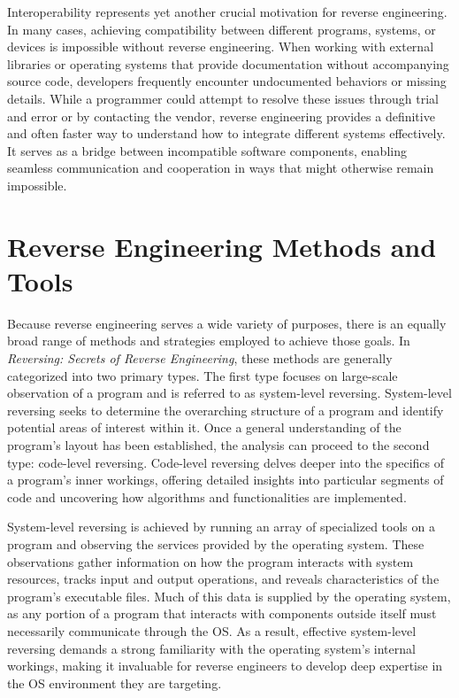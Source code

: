 Interoperability represents yet another crucial motivation for reverse engineering. In many cases, achieving compatibility between different programs, systems, or devices is impossible without reverse engineering. When working with external libraries or operating systems that provide documentation without accompanying source code, developers frequently encounter undocumented behaviors or missing details. While a programmer could attempt to resolve these issues through trial and error or by contacting the vendor, reverse engineering provides a definitive and often faster way to understand how to integrate different systems effectively. It serves as a bridge between incompatible software components, enabling seamless communication and cooperation in ways that might otherwise remain impossible.

\section{Reverse Engineering Methods and Tools}

Because reverse engineering serves a wide variety of purposes, there is an equally broad range of methods and strategies employed to achieve those goals. In \textit{Reversing: Secrets of Reverse Engineering}, these methods are generally categorized into two primary types. The first type focuses on large-scale observation of a program and is referred to as system-level reversing. System-level reversing seeks to determine the overarching structure of a program and identify potential areas of interest within it. Once a general understanding of the program’s layout has been established, the analysis can proceed to the second type: code-level reversing. Code-level reversing delves deeper into the specifics of a program’s inner workings, offering detailed insights into particular segments of code and uncovering how algorithms and functionalities are implemented.

System-level reversing is achieved by running an array of specialized tools on a program and observing the services provided by the operating system. These observations gather information on how the program interacts with system resources, tracks input and output operations, and reveals characteristics of the program’s executable files. Much of this data is supplied by the operating system, as any portion of a program that interacts with components outside itself must necessarily communicate through the OS. As a result, effective system-level reversing demands a strong familiarity with the operating system’s internal workings, making it invaluable for reverse engineers to develop deep expertise in the OS environment they are targeting.

